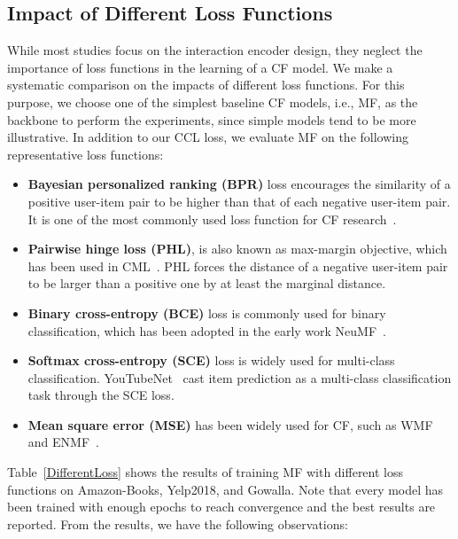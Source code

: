\documentclass[sigconf,authorversion]{acmart}
\begin{document}
\subsection{Impact of Different Loss Functions}\label{subsec:lossFunc}
While most studies focus on the interaction encoder design, they neglect the importance of loss functions in the learning of a CF model. We make a systematic comparison on the impacts of different loss functions. For this purpose, we choose one of the simplest baseline CF models, i.e., MF, as the backbone to perform the experiments, since simple models tend to be more illustrative. In addition to our CCL loss, we evaluate MF on the following representative loss functions:
\begin{itemize}
    \item \textbf{Bayesian personalized ranking (BPR)} loss 
    encourages the similarity of a positive user-item pair to be higher than that of each negative user-item pair. It is one of the most commonly used loss function for CF research~\cite{BPR,NGCF,LightGCN,DGCF}.

    \item \textbf{Pairwise hinge loss (PHL)}, is also known as max-margin objective, which has been used in CML~\citep{CML}. PHL forces the distance of a negative user-item pair to be larger than a positive one by at least the marginal distance.
    
    \item \textbf{Binary cross-entropy (BCE)} loss is commonly used for binary classification, which has been adopted in the early work NeuMF~\cite{NeuMF}.
    
    \item \textbf{Softmax cross-entropy (SCE)} loss is widely used for multi-class classification. YouTubeNet~\cite{YouTubeNet} cast item prediction as a multi-class classification task through the SCE loss.
  
    


      \item \textbf{Mean square error (MSE)} has been widely used for CF, such as WMF~\cite{WMF} and ENMF~\cite{ENMF}. 
 
\end{itemize}

Table~\ref{DifferentLoss} shows the results of training MF with different loss functions on Amazon-Books, Yelp2018, and Gowalla. Note that every model has been trained with enough epochs to reach convergence and the best results are reported. From the results, we have the following observations:
\end{document}
